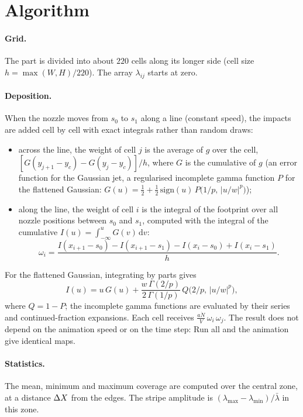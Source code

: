 \documentclass[11pt,a4paper]{article}
\begin{document}
\section{Algorithm}

\paragraph{Grid.} The part is divided into about $220$ cells along its longer side (cell size $h=\max(W,H)/220$). The array $\lambda_{ij}$ starts at zero.

\paragraph{Deposition.} When the nozzle moves from $s_0$ to $s_1$ along a line (constant speed), the impacts are added cell by cell with exact integrals rather than random draws:
\begin{itemize}[leftmargin=*]
\item across the line, the weight of cell $j$ is the average of $g$ over the cell, $[G(y_{j+1}-y_c)-G(y_j-y_c)]/h$, where $G$ is the cumulative of $g$ (an error function for the Gaussian jet, a regularised incomplete gamma function $P$ for the flattened Gaussian: $G(u)=\tfrac12+\tfrac12\,\mathrm{sign}(u)\,P\bigl(1/p,\,|u/w|^p\bigr)$);
\item along the line, the weight of cell $i$ is the integral of the footprint over all nozzle positions between $s_0$ and $s_1$, computed with the integral of the cumulative $I(u)=\int_{-\infty}^u G(v)\,\mathrm{d}v$:
\begin{equation}
\omega_i=\frac{I(x_{i+1}-s_0)-I(x_{i+1}-s_1)-I(x_i-s_0)+I(x_i-s_1)}{h}.
\end{equation}
\end{itemize}
For the flattened Gaussian, integrating by parts gives
\begin{equation}
I(u)=u\,G(u)+\frac{w\,\Gamma(2/p)}{2\,\Gamma(1/p)}\,Q\bigl(2/p,\,|u/w|^p\bigr),
\end{equation}
where $Q=1-P$; the incomplete gamma functions are evaluated by their series and continued-fraction expansions. Each cell receives $\frac{a\dot N}{V}\,\omega_i\,\omega_j$. The result does not depend on the animation speed or on the time step: \textsf{Run all} and the animation give identical maps.

\paragraph{Statistics.} The mean, minimum and maximum coverage are computed over the central zone, at a distance $\Delta X$ from the edges. The stripe amplitude is $(\lambda_{\max}-\lambda_{\min})/\bar\lambda$ in this zone.
\end{document}
